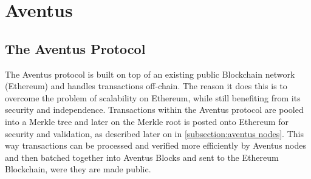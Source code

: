 
\section{Aventus}

\begin{comment}
\subsection{Problems}
\paragraph{Oversight}

The main problem here is defined as a lack of oversight over digital assets from the issuer of these assets/. Oversight is this context is defined as the ability for an issuer see exactly what is happening to their asset at any given moment in order to derive increased value from their digital assets.

\paragraph{Control}

Control allows an issuer to protect the value of their digital assets. In order to achieve total control, the issuer needs control over how their assets are created, managed, and sold.

A lack of control can lead to problems such as distribution of fake copies, price inflation in reselling markets, distribution by unauthorised vendors.
\end{comment}

\subsection{The Aventus Protocol}

The Aventus protocol is built on top of an existing public Blockchain network (Ethereum) and handles transactions off-chain. The reason it does this is to overcome the problem of scalability on Ethereum, while still benefiting from its security and independence.
Transactions within the Aventus protocol are pooled into a Merkle tree and later on the Merkle root is posted onto Ethereum for security and validation, as described later on in \ref{subsection:aventus nodes}.
This way transactions can be processed and verified more efficiently by Aventus nodes and then batched together into Aventus Blocks and sent to the Ethereum Blockchain, were they are made public.

